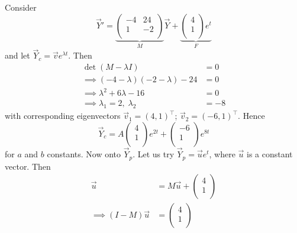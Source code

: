 \documentclass{../../template/note}
\begin{document}
    \begin{example}
        Consider
        \[
            \vec Y' = \underbrace{\begin{pmatrix}
             -4 & 24 \\
             1 & -2 \\
            \end{pmatrix}}_M \vec Y + \underbrace{\begin{pmatrix}
             4 \\
             1 \\
            \end{pmatrix}e^t}_F
        \]
        and let \(\vec Y_c = \vec v e^{\lambda t}\). Then
        \begin{align*}
            \det(M - \lambda I) &= 0 \\
            \implies (-4-\lambda)(-2-\lambda)-24&=0 \\
            \implies \lambda^2 + 6\lambda - 16 &= 0 \\
            \implies \lambda_1 = 2, \; \lambda_2 &= -8
        \end{align*}
        with corresponding eigenvectors \(\vec v_1 = (4, 1)^\intercal\); \(\vec v_2 = (-6, 1)^\intercal\). Hence
        \[
            \vec Y_c = A \begin{pmatrix}
             4 \\
             1 \\
            \end{pmatrix} e^{2t} + \begin{pmatrix}
             -6 \\
             1 \\
            \end{pmatrix} e^{8t}
        \]
        for \(a\) and \(b\) constants. Now onto \(\vec Y_p\). Let us try \(\vec Y_p = \vec u e^t\), where \(\vec u\) is a constant vector. Then
        \begin{align*}
            \vec u &= M \vec u + \begin{pmatrix}
             4 \\
             1 \\
            \end{pmatrix} \\
            \implies (I-M) \vec u &= \begin{pmatrix}
             4 \\
             1 \\
            \end{pmatrix} \\

\end{align*}
\end{example}
\end{document}
